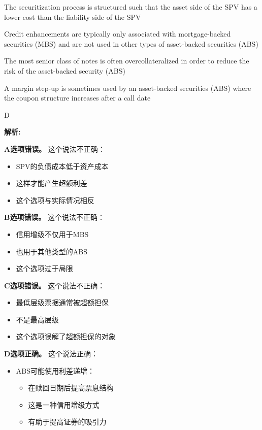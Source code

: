 \documentclass{article}
\newenvironment{explanation}
{\textbf{解析:}\par}
{\par}
\begin{document}
\begin{choices}
    \item The securitization process is structured such that the asset side of the SPV has a lower cost than the liability side of the SPV
    \item Credit enhancements are typically only associated with mortgage-backed securities (MBS) and are not used in other types of asset-backed securities (ABS)
    \item The most senior class of notes is often overcollateralized in order to reduce the risk of the asset-backed security (ABS)
    \item A margin step-up is sometimes used by an asset-backed securities (ABS) where the coupon structure increases after a call date
\end{choices}

\begin{correctanswer}
    D
\end{correctanswer}

\begin{explanation}
    \textbf{A选项错误。}
    这个说法不正确：
    \begin{itemize}
        \item SPV的负债成本低于资产成本
        \item 这样才能产生超额利差
        \item 这个选项与实际情况相反
    \end{itemize}

    \textbf{B选项错误。}
    这个说法不正确：
    \begin{itemize}
        \item 信用增级不仅用于MBS
        \item 也用于其他类型的ABS
        \item 这个选项过于局限
    \end{itemize}

    \textbf{C选项错误。}
    这个说法不正确：
    \begin{itemize}
        \item 最低层级票据通常被超额担保
        \item 不是最高层级
        \item 这个选项误解了超额担保的对象
    \end{itemize}

    \textbf{D选项正确。}
    这个说法正确：
    \begin{itemize}
        \item ABS可能使用利差递增：
        \begin{itemize}
            \item 在赎回日期后提高票息结构
            \item 这是一种信用增级方式
            \item 有助于提高证券的吸引力
        \end{itemize}
    \end{itemize}
\end{explanation}
\end{document}
